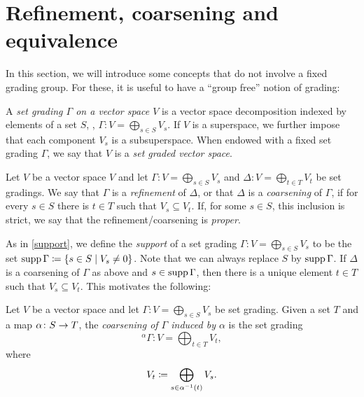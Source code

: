 
\section{Refinement, coarsening and equivalence}\label{ssec:universal_group}

In this section, we will introduce some concepts that do not involve a fixed grading group. 
For these, it is useful to have a ``group free'' notion of grading:

\begin{defi}\label{defi:set-grading}
    A \emph{set grading $\Gamma$ on a vector space $V$} is a vector space decomposition indexed by elements of a set $S$, \ie, 
    $\Gamma : V = \bigoplus_{s\in S} V_s$. 
    If $V$ is a superspace, we further impose that each component $V_s$ is a subsuperspace. 
    When endowed with a fixed set grading $\Gamma$, we say that $V$ is a \emph{set graded vector space}. 
\end{defi}

\begin{defi}\label{defi:ref-coars}
    Let $V$ be a vector space $V$ and let $\Gamma : V = \bigoplus_{s\in S} V_s$ and $\Delta : V = \bigoplus_{t \in T} V_{t}$ be set gradings. 
    We say that $\Gamma$ is a \emph{refinement} of $\Delta$, or that $\Delta$ is a \emph{coarsening} of $\Gamma$, if for every $s \in S$ there is $t \in T$ such that $V_s \subseteq V_t$. 
    If, for some $s \in S$, this inclusion is strict, we say that the refinement/coarsening is \emph{proper}. 
\end{defi}


As in \cref{support}, we define the \emph{support} of a set grading $\Gamma : V = \bigoplus_{s\in S} V_s$ to be the set $\operatorname{supp} \Gamma \coloneqq \{ s \in S \mid V_s \neq 0 \}$. 
Note that we can always replace $S$ by $\operatorname{supp} \Gamma$. 
If $\Delta$ is a coarsening of $\Gamma$ as above and $s\in \operatorname{supp} \Gamma$, then there is a unique element $t \in T$ such that $V_s \subseteq V_t$. 
This motivates the following:

\begin{defi}\label{coars-induced}
    Let $V$ be a vector space and let $\Gamma : V = \bigoplus_{s\in S} V_s$ be set grading. 
    Given a set $T$ and a map $\alpha\colon S \to T$, the \emph{coarsening of $\Gamma$ induced by $\alpha$} is the set grading 
    \[
        {}^{\alpha}\Gamma : V = \bigoplus_{t\in T} V_t,
    \]
    where 
    \[
        V_t \coloneqq \bigoplus_{s \in \alpha^{-1} (t)} V_s.
    \]
\end{defi}

